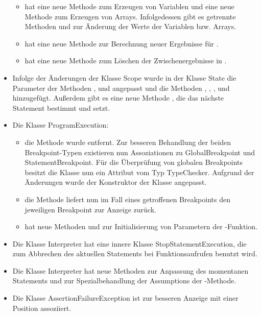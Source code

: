 \begin{itemize}
\begin{itemize}
    \item hat eine neue Methode  zum Erzeugen von Variablen und eine neue Methode  zum Erzeugen von Arrays. Infolgedessen gibt es getrennte Methoden  und  zur \"{A}nderung der Werte der Variablen bzw. Arrays.
    \item hat eine neue Methode  zur Berechnung neuer Ergebnisse f\"{u}r .
    \item hat eine neue Methode  zum L\"{o}schen der Zwischenergebnisse in .
  \end{itemize}
  \item Infolge der \"{A}nderungen der Klasse Scope wurde in der Klasse State die Parameter der Methoden ,  und  angepasst und die Methoden , , ,  und  hinzugef\"{u}gt. Au\ss erdem gibt es eine neue Methode , die das n\"{a}chste Statement bestimmt und setzt.
  \item Die Klasse ProgramExecution:
  \begin{itemize}
    \item die Methode  wurde entfernt. Zur besseren Behandlung der beiden Breakpoint-Typen existieren nun Assoziationen zu GlobalBreakpoint und StatementBreakpoint. F\"{u}r die \"{U}berpr\"{u}fung von globalen Breakpoints besitzt die Klasse nun ein Attribut vom Typ TypeChecker. Aufgrund der \"{A}nderungen wurde der Konstruktor der Klasse angepasst.
    \item die Methode  liefert nun im Fall eines getroffenen Breakpoints den jeweiligen Breakpoint zur Anzeige zur\"{u}ck.
    \item hat neue Methoden  und  zur Initialisierung von Parametern der -Funktion.
  \end{itemize}
  \item Die Klasse Interpreter hat eine innere Klasse StopStatementExecution, die zum Abbrechen des aktuellen Statements bei Funktionsaufrufen benutzt wird.
  \item Die Klasse Interpreter hat neue Methoden  zur Anpassung des momentanen Statements und  zur Spezialbehandlung der Assumptions der -Methode.
  \item Die Klasse AssertionFailureException ist zur besseren Anzeige mit einer Position assoziiert.
\end{itemize}

